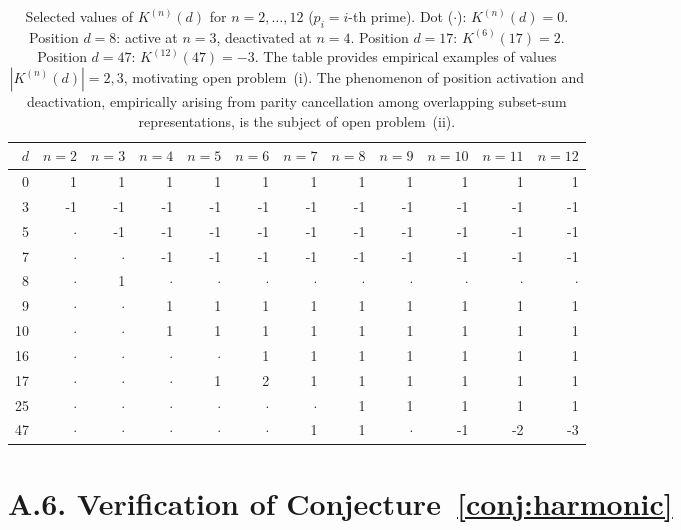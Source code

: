 \begin{table}[H]
\centering
\small
\begin{tabular}{r|rrrrrrrrrrr}
\toprule
$d$ & $n{=}2$ & $n{=}3$ & $n{=}4$ & $n{=}5$ & $n{=}6$ &
      $n{=}7$ & $n{=}8$ & $n{=}9$ & $n{=}10$ & $n{=}11$ & $n{=}12$ \\
\midrule
 0 &  1 &  1 &  1 &  1 &  1 &  1 &  1 &  1 &  1 &  1 &  1 \\
 3 & -1 & -1 & -1 & -1 & -1 & -1 & -1 & -1 & -1 & -1 & -1 \\
 5 &  $\cdot$ & -1 & -1 & -1 & -1 & -1 & -1 & -1 & -1 & -1 & -1 \\
 7 &  $\cdot$ &  $\cdot$ & -1 & -1 & -1 & -1 & -1 & -1 & -1 & -1 & -1 \\
 8 &  $\cdot$ &  1 &  $\cdot$ &  $\cdot$ &  $\cdot$ &  $\cdot$ &  $\cdot$ &  $\cdot$ &  $\cdot$ &  $\cdot$ &  $\cdot$ \\
 9 &  $\cdot$ &  $\cdot$ &  1 &  1 &  1 &  1 &  1 &  1 &  1 &  1 &  1 \\
10 &  $\cdot$ &  $\cdot$ &  1 &  1 &  1 &  1 &  1 &  1 &  1 &  1 &  1 \\
16 &  $\cdot$ &  $\cdot$ &  $\cdot$ &  $\cdot$ &  1 &  1 &  1 &  1 &  1 &  1 &  1 \\
17 &  $\cdot$ &  $\cdot$ &  $\cdot$ &  1 &  2 &  1 &  1 &  1 &  1 &  1 &  1 \\
25 &  $\cdot$ &  $\cdot$ &  $\cdot$ &  $\cdot$ &  $\cdot$ &  $\cdot$ &  1 &  1 &  1 &  1 &  1 \\
47 &  $\cdot$ &  $\cdot$ &  $\cdot$ &  $\cdot$ &  $\cdot$ &  1 &  1 &  $\cdot$ & -1 & -2 & -3 \\
\bottomrule
\end{tabular}
\caption{Selected values of $K^{(n)}(d)$ for $n = 2, \ldots, 12$
($p_i = i$-th prime). Dot ($\cdot$): $K^{(n)}(d) = 0$.
Position $d = 8$: active at $n=3$, deactivated at $n=4$.
Position $d = 17$: $K^{(6)}(17) = 2$.
Position $d = 47$: $K^{(12)}(47) = -3$.
The table provides empirical examples of values
$|K^{(n)}(d)| = 2, 3$, motivating open problem~(i).
The phenomenon of position activation and deactivation,
empirically arising from parity cancellation
among overlapping subset-sum representations,
is the subject of open problem~(ii).}
\label{tab:positions}
\end{table}


\section*{A.6. Verification of Conjecture~\ref{conj:harmonic}}
\label{subsec:a6-conjecture}

